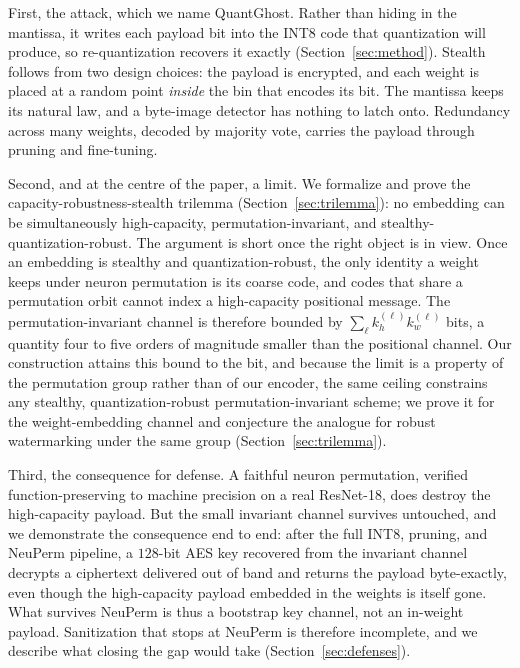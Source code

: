 \documentclass[10pt,journal]{IEEEtran}
\theoremstyle{remark}
\newcommand{\sys}{\mbox{QuantGhost}}
\begin{document}
First, the attack, which we name \sys. Rather than hiding in the mantissa, it writes
each payload bit into the INT8 code that quantization will produce, so re-quantization
recovers it exactly (Section~\ref{sec:method}). Stealth follows from two design choices:
the payload is encrypted, and each weight is placed at a random point \emph{inside} the
bin that encodes its bit. The mantissa keeps its natural law, and a byte-image detector has nothing to
latch onto. Redundancy across many weights, decoded by majority vote, carries the
payload through pruning and fine-tuning.

Second, and at the centre of the paper, a limit. We formalize and prove the
capacity-robustness-stealth trilemma (Section~\ref{sec:trilemma}): no embedding can be
simultaneously high-capacity, permutation-invariant, and stealthy-quantization-robust.
The argument is short once the right object is in view. Once an embedding is stealthy
and quantization-robust, the only identity a weight keeps under neuron permutation is
its coarse code, and codes that share a permutation orbit cannot index a high-capacity
positional message. The permutation-invariant channel is therefore bounded by
$\sum_\ell k_h^{(\ell)} k_w^{(\ell)}$ bits, a quantity four to five orders of magnitude
smaller than the positional channel. Our construction attains this bound to the bit, and
because the limit is a property of the permutation group rather than of our encoder, the
same ceiling constrains any stealthy, quantization-robust permutation-invariant scheme; we
prove it for the weight-embedding channel and conjecture the analogue for robust watermarking
under the same group (Section~\ref{sec:trilemma}).

Third, the consequence for defense. A faithful neuron permutation, verified
function-preserving to machine precision on a real ResNet-18, does destroy the
high-capacity payload. But the small invariant channel survives untouched, and we
demonstrate the consequence end to end: after the full INT8, pruning, and NeuPerm
pipeline, a $128$-bit AES key recovered from the invariant channel decrypts a ciphertext
delivered out of band and returns the payload byte-exactly, even though the high-capacity
payload embedded in the weights is itself gone. What survives NeuPerm is thus a bootstrap
key channel, not an in-weight payload. Sanitization that stops at NeuPerm is therefore
incomplete, and we describe what closing the gap would take (Section~\ref{sec:defenses}).
\end{document}
